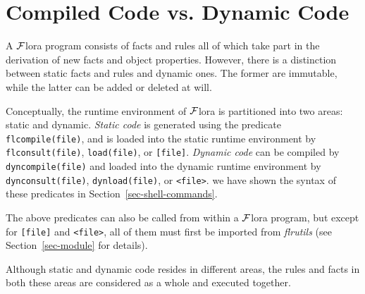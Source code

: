 \documentclass[11pt]{article}
\newcommand{\FLORA}{{\mbox{${\cal F}${\sc lora}}}\xspace}
\begin{document}
\section{Compiled Code vs. Dynamic Code}

A \FLORA program consists of facts and rules all of which take part in the
derivation of new facts and object properties.
However, there is a distinction between static facts and rules and dynamic
ones. The former are immutable, while the latter can be added or deleted at
will.

Conceptually, the runtime environment of \FLORA is partitioned into two
areas: static and dynamic. \emph{Static code} is generated using the
predicate {\tt flcompile(file)}, and is loaded into the static runtime
environment by {\tt flconsult(file)}, {\tt load(file)}, or {\tt [file]}.
\emph{Dynamic code} can be compiled by {\tt dyncompile(file)} and loaded
into the dynamic runtime environment by {\tt dynconsult(file)},
{\tt dynload(file)}, or \texttt{<file>}.  we have shown the syntax of
these predicates in Section~\ref{sec-shell-commands}.

The above predicates can also be called from within a \FLORA program, but
except for {\tt [file]} and \texttt{<file>}, all of them must first be
imported from \emph{flrutils} (see Section~\ref{sec-module} for details).

Although static and dynamic code resides in different areas, the rules and
facts in both these areas are considered as a whole and executed together.
\end{document}
